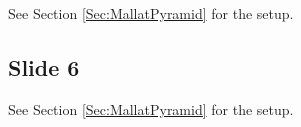 \documentclass[twoside]{amsart}
\theoremstyle{plain}
\theoremstyle{definition}
\theoremstyle{remark}
\numberwithin{equation}{section}
\begin{document}
\begin{comment}
\[
\begin{gathered}
S(z^2) = S(e^{i2\omega})  \\
\xrightarrow{ \mathcal{F}^{-1}} \mathcal{F}^{-1}[S(z^2)] = \frac{1}{2\pi } \int_{-\pi}^{\pi} d\omega e^{i\omega t}S(2\omega) \overset{u=2\omega}{=} \frac{1}{4\pi } \int_{-\pi}^{\pi} du e^{ i ut/2} S(u) = \frac{1}{2} S(t/2)
\end{gathered}
\]

Recall that for scaling function $\phi$,
\[
\begin{gathered}
\phi = \phi(t) \in V^0 \subset V^1 \text{ and } V^1 = V^0 \oplus W^0 \\
\phi(t) = \sum_k c_k \phi(t - k) := \sum_k c_k \phi^0_k = \sum_k c_k^1 2^{1/2} \phi(2 t- k ) := \sum_k c_k^1 \phi^1_k 
\end{gathered}
\]
$\phi$ in the frequency domain or $z$-domain, $\phi(z) \in L^2(\mathbb{C})$,
\[
\begin{gathered}
\phi(z) \in \mathcal{F}[V^0] \subset \mathcal{F}[V^1] \text{ and } \mathcal{F}[V^1] = \mathcal{F}[V^0] \oplus \mathcal{F}[W^0] \\
\phi(z) = \sum_k c_k z^{-k} \widehat{\phi}(z) := \sum_k c_k \widehat{\phi}_k^0 = \sum_k c_k^1 2^{1/2} z^{-\frac{k}{2}} \widehat{\phi}(z^{1/2} ) := \sum_k c^1_k \widehat{\phi}^1_k
\end{gathered}
\]

For wavelet $\psi =\psi(t) \in W^0 = V^1 \ominus V^0 \subset V^1$, 
\[
\begin{gathered}
  \psi(t) = \sum_k d^1_k 2^{1/2} \phi(2t -k) = \sum_k d_k \psi^0_k(t) = \sum_k d_k \psi(t - k) = \sum_k d_k \sum_n (-1)^n c_{-n+1} \phi(2(t-k)-n)
\end{gathered}
\]
with $d^1_k = (-1)^k c^1_{-k+1}$
\end{comment}

See Section \ref{Sec:MallatPyramid} for the setup.  

\subsection{Slide 6}

See Section \ref{Sec:MallatPyramid} for the setup.  
\end{document}
